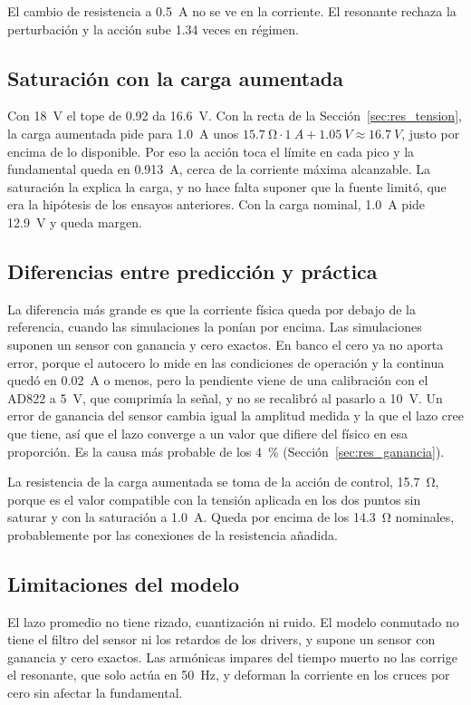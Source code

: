 \documentclass[journal]{IEEEtran}
\begin{document}
El cambio de resistencia a \SI{0.5}{A} no se ve en la corriente. El resonante rechaza la perturbación y la acción sube \num{1.34} veces en régimen.

\subsection{Saturación con la carga aumentada}
\label{sec:saturacion}
Con \SI{18}{V} el tope de \num{0.92} da \SI{16.6}{V}. Con la recta de la Sección~\ref{sec:res_tension}, la carga aumentada pide para \SI{1.0}{A} unos $\SI{15.7}{\ohm}\cdot\SI{1}{A}+\SI{1.05}{V}\approx\SI{16.7}{V}$, justo por encima de lo disponible. Por eso la acción toca el límite en cada pico y la fundamental queda en \SI{0.913}{A}, cerca de la corriente máxima alcanzable. La saturación la explica la carga, y no hace falta suponer que la fuente limitó, que era la hipótesis de los ensayos anteriores. Con la carga nominal, \SI{1.0}{A} pide \SI{12.9}{V} y queda margen.

\subsection{Diferencias entre predicción y práctica}
La diferencia más grande es que la corriente física queda por debajo de la referencia, cuando las simulaciones la ponían por encima. Las simulaciones suponen un sensor con ganancia y cero exactos. En banco el cero ya no aporta error, porque el autocero lo mide en las condiciones de operación y la continua quedó en \SI{0.02}{A} o menos, pero la pendiente viene de una calibración con el AD822 a \SI{5}{V}, que comprimía la señal, y no se recalibró al pasarlo a \SI{10}{V}. Un error de ganancia del sensor cambia igual la amplitud medida y la que el lazo cree que tiene, así que el lazo converge a un valor que difiere del físico en esa proporción. Es la causa más probable de los \SI{4}{\percent} (Sección~\ref{sec:res_ganancia}).

La resistencia de la carga aumentada se toma de la acción de control, \SI{15.7}{\ohm}, porque es el valor compatible con la tensión aplicada en los dos puntos sin saturar y con la saturación a \SI{1.0}{A}. Queda por encima de los \SI{14.3}{\ohm} nominales, probablemente por las conexiones de la resistencia añadida.

\subsection{Limitaciones del modelo}
El lazo promedio no tiene rizado, cuantización ni ruido. El modelo conmutado no tiene el filtro del sensor ni los retardos de los drivers, y supone un sensor con ganancia y cero exactos. Las armónicas impares del tiempo muerto \cite[sec.~8-5]{mohan2003power} no las corrige el resonante, que solo actúa en \SI{50}{Hz}, y deforman la corriente en los cruces por cero sin afectar la fundamental.
\end{document}
